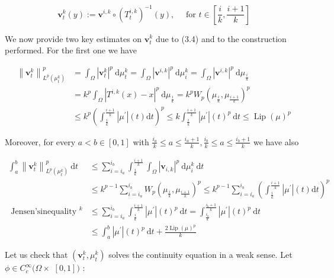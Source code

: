 \documentclass[10pt]{article}
\begin{document}
\[
\mathbf{v}_{t}^{k}(y):=\mathbf{v}^{i, k} \circ\left(T_{t}^{i, k}\right)^{-1}(y), \quad \text { for } t \in\left[\frac{i}{k}, \frac{i+1}{k}\right]
\]

We now provide two key estimates on \(\mathbf{v}_{t}^{k}\) due to (3.4) and to the construction performed. For the first one we have

\[
\begin{aligned}
\left\|\mathbf{v}_{t}^{k}\right\|_{L^{p}\left(\mu_{t}^{k}\right)}^{p} & =\int_{\Omega}\left|\mathbf{v}_{t}^{k}\right|^{p} \mathrm{~d} \mu_{t}^{k}=\int_{\Omega}\left|\mathbf{v}^{i, k}\right|^{p} \mathrm{~d} \mu_{i}^{k}=\int_{\Omega}\left|\mathbf{v}^{i, k}\right|^{p} \mathrm{~d} \mu_{\frac{i}{k}} \\
& =k^{p} \int_{\Omega}\left|T^{i, k}(x)-x\right|^{p} \mathrm{~d} \mu_{\frac{i}{k}}=k^{p} W_{p}\left(\mu_{\frac{i}{k}}, \mu_{\frac{i+1}{k}}\right)^{p} \\
& \leq k^{p}\left(\int_{\frac{i}{k}}^{\frac{i+1}{k}}\left|\mu^{\prime}\right|(t) \mathrm{d} t\right)^{p} \leq k \int_{\frac{i}{k}}^{\frac{i+1}{k}}\left|\mu^{\prime}\right|(t)^{p} \mathrm{~d} t \leq \operatorname{Lip}(\mu)^{p}
\end{aligned}
\]

Moreover, for every \(a<b \in[0,1]\) with \(\frac{i_{a}}{k} \leq a \leq \frac{i_{a}+1}{k}, \frac{i_{b}}{k} \leq a \leq \frac{i_{b}+1}{k}\) we have also

\[
\begin{aligned}
\int_{a}^{b}\left\|\mathbf{v}_{t}^{k}\right\|_{L^{p}\left(\mu_{t}^{k}\right)}^{p} \mathrm{~d} t & \leq \sum_{i=i_{a}}^{i_{b}} \int_{\frac{i}{k}}^{\frac{i+1}{k}} \int_{\Omega}\left|\mathbf{v}_{i, k}\right|^{p} \mathrm{~d} \mu_{i}^{k} \mathrm{~d} t \\
& \leq k^{p-1} \sum_{i=i_{a}}^{i_{b}} W_{p}\left(\mu_{\frac{i}{k}}, \mu_{\frac{i+1}{k}}\right)^{p} \leq k^{p-1} \sum_{i=i_{a}}^{i_{b}}\left(\int_{\frac{i}{k}}^{\frac{i+1}{k}}\left|\mu^{\prime}\right|(t) \mathrm{d} t\right)^{p} \\
\text { Jensen'sinequality }^{k} & \leq \sum_{i=i_{a}}^{i_{b}} \int_{\frac{i}{k}}^{\frac{i+1}{k}}\left|\mu^{\prime}\right|(t)^{p} \mathrm{~d} t=\int_{\frac{i_{a}}{k}}^{\frac{i_{b}+1}{k}}\left|\mu^{\prime}\right|(t)^{p} \mathrm{~d} t \\
& \leq \int_{a}^{b}\left|\mu^{\prime}\right|(t)^{p} \mathrm{~d} t+\frac{2 \operatorname{Lip}(\mu)^{p}}{k}
\end{aligned}
\]

Let us check that \(\left(\mathbf{v}_{t}^{k}, \mu_{t}^{k}\right)\) solves the continuity equation in a weak sense. Let \(\phi \in C_{c}^{\infty}(\Omega \times\) \([0,1])\) :
\end{document}
